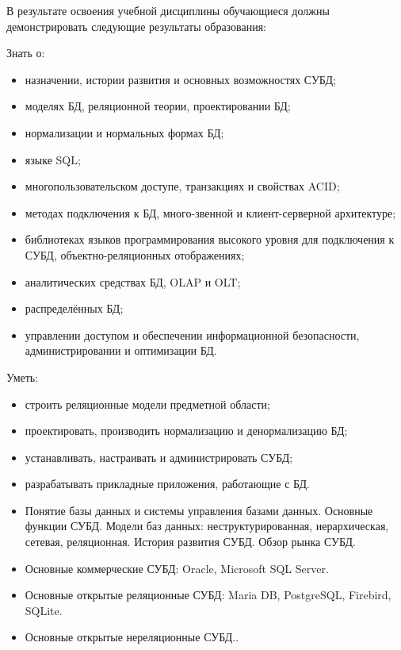 \documentclass[a4paper]{article}
\begin{document}
В результате освоения учебной дисциплины обучающиеся должны демонстрировать следующие результаты образования:

Знать о:
\begin{itemize}
  \item назначении, истории развития и основных возможностях СУБД;
  \item моделях БД, реляционной теории, проектировании БД;
  \item нормализации и нормальных формах БД;
  \item языке SQL;
  \item многопользовательском доступе, транзакциях и свойствах ACID;
  \item методах подключения к БД, много-звенной и клиент-серверной архитектуре;
  \item библиотеках языков программирования высокого уровня для подключения к СУБД, объектно-реляционных отображениях;
  \item аналитических средствах БД, OLAP и OLT;
  \item распределённых БД;
  \item управлении доступом и обеспечении информационной безопасности, администрировании и оптимизации БД.
\end{itemize}

Уметь:
\begin{itemize}
  \item строить реляционные модели предметной области;
  \item проектировать, производить нормализацию и денормализацию БД;
  \item устанавливать, настраивать и администрировать СУБД;
  \item разрабатывать прикладные приложения, работающие с БД.
\end{itemize}

\CourseTheorySection


\begin{itemize}
  \item Понятие базы данных и системы управления базами данных. Основные функции СУБД. Модели баз данных: неструктурированная, иерархическая, сетевая, реляционная. История развития СУБД. Обзор рынка СУБД.
  \item Основные коммерческие СУБД: Oracle, Microsoft SQL Server.
  \item Основные открытые реляционные СУБД: Maria DB, PostgreSQL, Firebird, SQLite.
  \item Основные открытые нереляционные СУБД..
\end{itemize}
\end{document}
